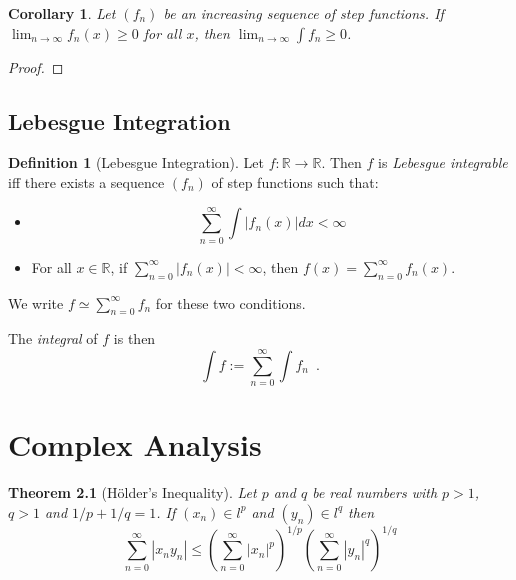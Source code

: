 \documentclass{book}
\let\qed\relax
\newtheorem{cor}{Corollary}[ax]
\newtheorem{thm}[ax]{Theorem}
\theoremstyle{definition}
\newtheorem{df}[ax]{Definition}
\begin{document}
\begin{cor}
Let $(f_n)$ be an increasing sequence of step functions. If $\lim_{n \rightarrow \infty} f_n(x) \geq 0$ for all $x$, then $\lim_{n \rightarrow \infty} \int f_n \geq 0$.
\end{cor}

\begin{proof}
\pf
{}
\qed
\end{proof}

\section{Lebesgue Integration}

\begin{df}[Lebesgue Integration]
Let $f : \mathbb{R} \rightarrow \mathbb{R}$. Then $f$ is \emph{Lebesgue integrable} iff there exists a sequence $(f_n)$ of step functions such that:
\begin{itemize}
\item
\[ \sum_{n=0}^\infty \int |f_n(x)|dx < \infty \]
\item
For all $x \in \mathbb{R}$, if $\sum_{n=0}^\infty |f_n(x)| < \infty$, then $f(x) = \sum_{n=0}^\infty f_n(x)$.
\end{itemize}
We write $f \simeq \sum_{n=0}^\infty f_n$ for these two conditions.

The \emph{integral} of $f$ is then
\[ \int f := \sum_{n=0}^\infty \int f_n \enspace . \]
\end{df}

\chapter{Complex Analysis}

\begin{thm}[H\"{o}lder's Inequality]
Let $p$ and $q$ be real numbers with $p > 1$, $q > 1$ and $1/p + 1/q = 1$. If $(x_n) \in l^p$ and $(y_n) \in l^q$ then
\[ \sum_{n=0}^\infty |x_n y_n| \leq \left( \sum_{n=0}^\infty  |x_n|^p \right)^{1/p} \left( \sum_{n=0}^\infty |y_n|^q \right)^{1/q} \]
\end{thm}
\end{document}
